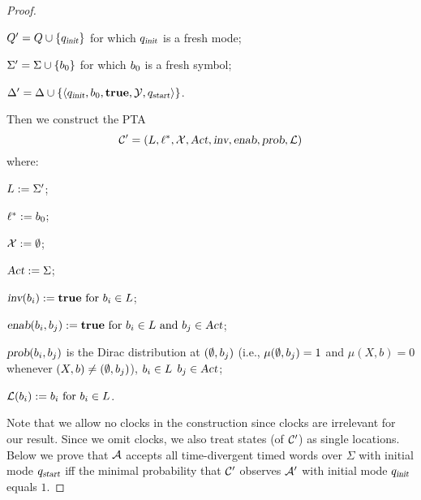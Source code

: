 \begin{proof}
\begin{compactitem}
\item $Q'   = Q  \cup \{ q_{\mbox{\sl\scriptsize init} } \}$ for which $q_{\mbox{\sl\scriptsize init} }$ is a fresh mode;
\item $\Sigma'  = \Sigma \cup \{ b_{0} \}$ for which $b_{0}$ is a fresh symbol;
\item $\Delta'     = \Delta    \cup \{ \langle
            q_{\mbox{\sl\scriptsize init} },
            b_{0},
            \mathbf{true},
            \mathcal{Y},
            q_{\mbox{\sl\scriptsize start}}
        \rangle
    \}$.
\end{compactitem}
Then we construct the PTA
\[
\mathcal{C}'=\left(L, \ell^*, \mathcal{X}, \mbox{\sl Act}, \mbox{\sl inv}, \mbox{\sl enab},  \mbox{\sl prob}, \mathcal{L}\right)
\]
where:
\begin{compactitem}
    \item $L      :=  \Sigma'$;
    \item $\ell^*     :=  b_{0} $;
    \item $\mathcal{X}    :=  \emptyset $;
    \item $\mbox{\sl Act}      :=  \Sigma $;
    \item $\mbox{\sl inv}(b_{i})              :=  \mathbf{true}
                                            \text{ for }
                                            b_{i} \in L$;
    \item $\mbox{\sl enab}(b_{i},b_{j})   :=  \mathbf{true}
                                            \text{ for }
                                            b_{i} \in L
                                            \text{ and }
                                            b_{j} \in \mbox{\sl Act}$;
    \item $\mbox{\sl prob}(b_{i},b_{j})$ is the Dirac distribution at $(\emptyset,b_{j})$ (i.e., $\mu(\emptyset,b_{j})=1$ and $\mu(X,b)=0$ whenever $(X,b)\ne(\emptyset,b_{j})$),
                                            $b_{i} \in L$
                                            $b_{j} \in \mbox{\sl Act}$;
    \item $\mathcal{L}(b_{i})           :=  b_{i}
                                            \text{ for } b_{i} \in L$.
\end{compactitem}
Note that we allow no clocks in the construction since clocks are irrelevant for our result.
Since we omit clocks, we also treat states (of $\mathcal{C}'$) as single locations.
Below we prove that $\mathcal{A}$ accepts all time-divergent timed words over $\Sigma$ with initial mode $q_{\mbox{\sl\scriptsize start}}$ iff
the minimal probability that $\mathcal{C}'$ observes $\mathcal{A}'$ with initial mode $q_{\mbox{\sl\scriptsize init} }$ equals $1$.


\end{proof}
